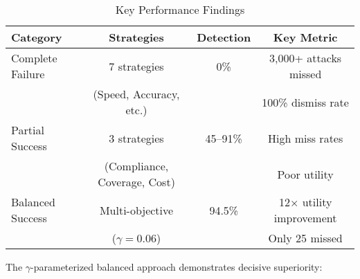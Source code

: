 \documentclass[10pt,conference]{IEEEtran}
\begin{document}
\begin{table*}[!ht]
\centering
\caption{Key Performance Findings}
\footnotesize
\begin{tabular}{@{}lccc@{}}
\toprule
\textbf{Category} & \textbf{Strategies} & \textbf{Detection} & \textbf{Key Metric} \\
\midrule

Complete Failure & 7 strategies & 0\% & 3,000+ attacks missed \\
& (Speed, Accuracy, etc.) & & 100\% dismiss rate \\
\midrule

Partial Success & 3 strategies & 45--91\% & High miss rates \\
& (Compliance, Coverage, Cost) & & Poor utility \\
\midrule

Balanced Success & Multi-objective & 94.5\% & 12$\times$ utility improvement \\
& ($\gamma=0.06$) & & Only 25 missed \\
\bottomrule
\end{tabular}
\end{table*}

The $\gamma$-parameterized balanced approach demonstrates decisive superiority:
\end{document}
